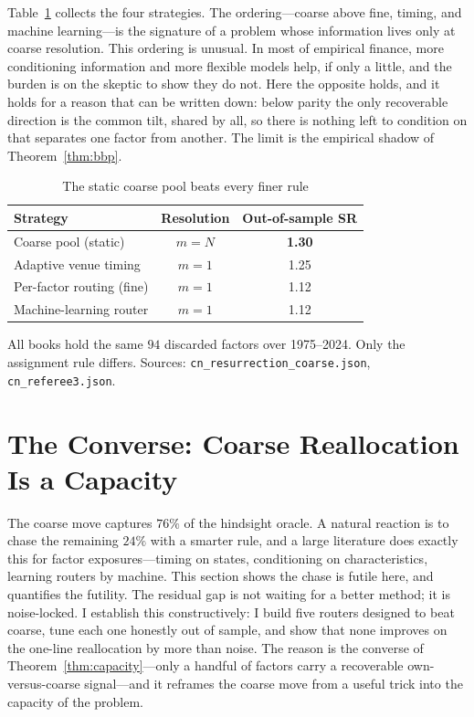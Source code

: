 \documentclass[12pt]{article}
\theoremstyle{plain}
\theoremstyle{definition}
\begin{document}
Table~\ref{tab:wall} collects the four strategies. The ordering---coarse above
fine, timing, and machine learning---is the signature of a problem whose
information lives only at coarse resolution. This ordering is unusual. In most
of empirical finance, more conditioning information and more
flexible models help, if only a little, and the burden is on the skeptic to show
they do not. Here the opposite holds, and it holds for a reason that can be
written down: below parity the only recoverable direction is the common tilt,
shared by all, so there is nothing left to condition on that separates one factor
from another. The limit is the empirical shadow of Theorem~\ref{thm:bbp}.

\begin{table}[t]
\centering
\caption{The static coarse pool beats every finer rule}
\label{tab:wall}
\begin{threeparttable}
\begin{tabular}{lcc}
\toprule
Strategy & Resolution & Out-of-sample SR \\
\midrule
Coarse pool (static)            & $m=N$ & \textbf{1.30} \\
Adaptive venue timing           & $m=1$ & 1.25 \\
Per-factor routing (fine)       & $m=1$ & 1.12 \\
Machine-learning router         & $m=1$ & 1.12 \\
\bottomrule
\end{tabular}
\begin{tablenotes}\footnotesize
\item All books hold the same $94$ discarded factors over 1975--2024. Only the
assignment rule differs. Sources: \texttt{cn\_resurrection\_coarse.json},
\texttt{cn\_referee3.json}.
\end{tablenotes}
\end{threeparttable}
\end{table}

\section{The Converse: Coarse Reallocation Is a Capacity}
\label{sec:solution}

The coarse move captures $76\%$ of the hindsight oracle. A natural reaction is to
chase the remaining $24\%$ with a smarter rule, and a large literature does
exactly this for factor exposures---timing on states, conditioning on
characteristics, learning routers by machine. This section shows the chase is
futile here, and quantifies the futility. The residual gap is not waiting for a better
method; it is noise-locked. I establish this constructively: I build five routers
designed to beat coarse, tune each one honestly out of sample, and show that none
improves on the one-line reallocation by more than noise. The reason is the
converse of Theorem~\ref{thm:capacity}---only a handful of factors carry a
recoverable own-versus-coarse signal---and it reframes the coarse move from a
useful trick into the capacity of the problem.
\end{document}
